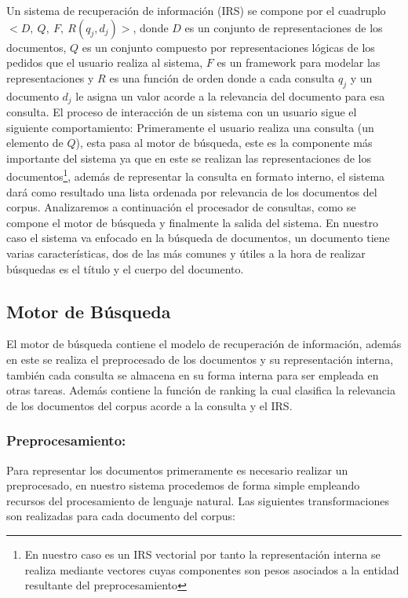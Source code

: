 \documentclass[runningheads,a4paper]{llncs}
\begin{document}
Un sistema de recuperación de información (IRS) se compone por el cuadruplo $<D,\ Q,\ F,\ R(q_j, d_j)>$, donde $D$ es un conjunto de representaciones de los documentos, $Q$ es un conjunto compuesto por representaciones lógicas de los pedidos que el usuario realiza al sistema, $F$ es un framework para modelar las representaciones y $R$ es una función de orden donde a cada consulta $q_j$ y un documento $d_j$ le asigna un valor acorde a la relevancia del documento para esa consulta. El proceso de interacción de un sistema con un usuario sigue el siguiente comportamiento: Primeramente el usuario realiza una consulta (un elemento de $Q$), esta pasa al motor de búsqueda, este es la componente más importante del sistema ya que en este se realizan las representaciones de los documentos\footnote{En nuestro caso es un IRS vectorial por tanto la representación interna se realiza mediante vectores cuyas componentes son pesos asociados a la entidad resultante del preprocesamiento}, además de representar la consulta en formato interno, el sistema dará como resultado una lista ordenada por relevancia de los documentos del corpus. Analizaremos a continuación el procesador de consultas, como se compone el motor de búsqueda y finalmente la salida del sistema. En nuestro caso el sistema va enfocado en la búsqueda de documentos, un documento tiene varias características, dos de las más comunes y útiles a la hora de realizar búsquedas es el título y el cuerpo del documento.

\subsection*{Motor de Búsqueda}

El motor de búsqueda contiene el modelo de recuperación de información, además en este se realiza el preprocesado de los documentos y su representación interna, también cada consulta se almacena en su forma interna para ser empleada en otras tareas. Además contiene la función de ranking la cual clasifica la relevancia de los documentos del corpus acorde a la consulta y el IRS.

\subsubsection{Preprocesamiento:} 

Para representar los documentos primeramente es necesario realizar un preprocesado, en nuestro sistema procedemos de forma simple empleando recursos del procesamiento de lenguaje natural. Las siguientes transformaciones son realizadas para cada documento del corpus:
\end{document}
